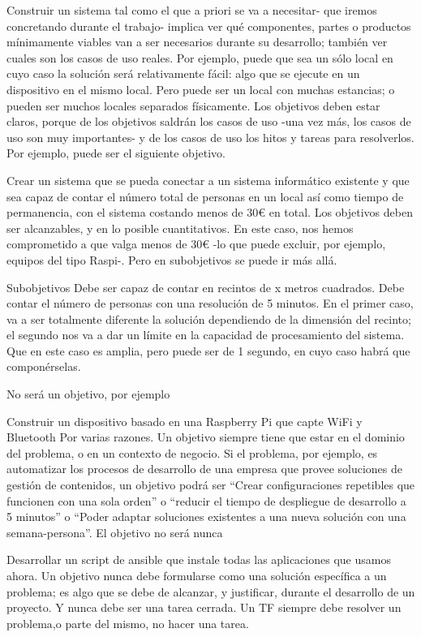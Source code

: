 Construir un sistema tal como el que a priori se va a necesitar- que 
iremos concretando durante el trabajo- implica ver qué componentes, 
partes o productos mínimamente viables van a ser necesarios 
durante su desarrollo; también ver cuales son los casos de uso 
reales. Por ejemplo, puede que sea un sólo local en cuyo caso 
la solución será relativamente fácil: algo que se ejecute en 
un dispositivo en el mismo local. Pero puede ser un local 
con muchas estancias; o pueden ser muchos locales separados 
físicamente. Los objetivos deben estar claros, porque de 
los objetivos saldrán los casos de uso -una vez más, los casos 
de uso son muy importantes- y de los casos de uso los 
hitos y tareas para resolverlos. Por ejemplo, puede ser 
el siguiente objetivo.

Crear un sistema que se pueda conectar a un sistema informático 
existente y que sea capaz de contar el número total de 
personas en un local así como tiempo de permanencia, 
con el sistema costando menos de 30€ en total.
Los objetivos deben ser alcanzables, y en lo posible 
cuantitativos. En este caso, nos hemos comprometido 
a que valga menos de 30€ -lo que puede excluir, por ejemplo, 
equipos del tipo Raspi-. Pero en subobjetivos se puede ir más allá.

Subobjetivos
Debe ser capaz de contar en recintos de x metros cuadrados.
Debe contar el número de personas con una resolución de 5 minutos.
En el primer caso, va a ser totalmente diferente la solución 
dependiendo de la dimensión del recinto; el segundo nos va a 
dar un límite en la capacidad de procesamiento del sistema. 
Que en este caso es amplia, pero puede ser de 1 segundo, en 
cuyo caso habrá que componérselas.

No será un objetivo, por ejemplo

Construir un dispositivo basado en una Raspberry Pi que 
capte WiFi y Bluetooth
Por varias razones. Un objetivo siempre tiene que estar 
en el dominio del problema, o en un contexto de negocio. 
Si el problema, por ejemplo, es automatizar los procesos 
de desarrollo de una empresa que provee soluciones de 
gestión de contenidos, un objetivo podrá ser “Crear 
configuraciones repetibles que funcionen con una sola 
orden” o “reducir el tiempo de despliegue de desarrollo 
a 5 minutos” o “Poder adaptar soluciones existentes a 
una nueva solución con una semana-persona”. El objetivo no será nunca

Desarrollar un script de ansible que instale todas las 
aplicaciones que usamos ahora.
Un objetivo nunca debe formularse como una solución 
específica a un problema; es algo que se debe de 
alcanzar, y justificar, durante el desarrollo de 
un proyecto. Y nunca debe ser una tarea cerrada. 
Un TF siempre debe resolver un problema,o parte del mismo, no hacer una tarea.

